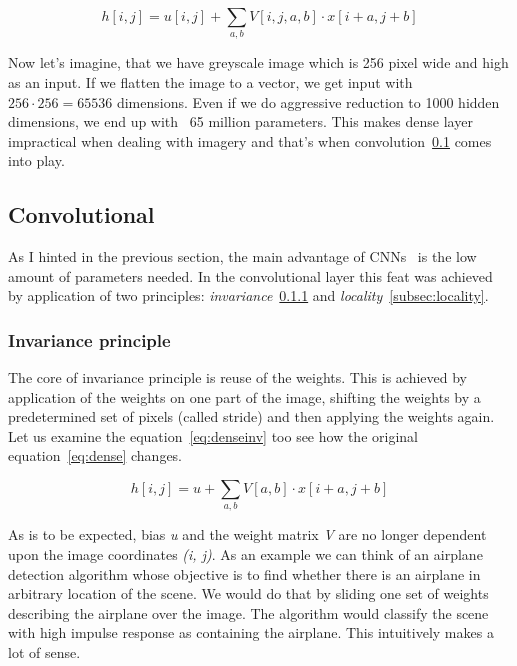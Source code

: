 \begin{equation}
    \label{eq:dense}
    h[i, j] = u[i,j] + \sum_{a,b} V[i,j,a,b] \cdot x[i+a,j+b]
\end{equation}

Now let's imagine, that we have greyscale image which is 256 pixel wide and high as an input.
If we flatten the image to a vector, we get input with $256\cdot256 = 65536$ dimensions.
Even if we do aggressive reduction to 1000 hidden dimensions, we end up with ~65 million parameters.
This makes dense layer impractical when dealing with imagery and that's when convolution~\ref{sec:convolutional} comes
into play.

\subsection{Convolutional}\label{sec:convolutional}
As I hinted in the previous section, the main advantage of CNNs~\cite{ConvLayer} is the low amount of parameters needed.
In the convolutional layer this feat was achieved by application of two principles:
\textit{invariance}~\ref{subsec:invariance} and \textit{locality}~\ref{subsec:locality}.

\subsubsection{Invariance principle}\label{subsec:invariance}
The core of invariance principle is reuse of the weights.
This is achieved by application of the weights on one part of the image, shifting the weights by a predetermined set
of pixels (called stride) and then applying the weights again.
Let us examine the equation~\ref{eq:denseinv} too see how the original equation~\ref{eq:dense} changes.

\begin{equation}
    \label{eq:denseinv}
    h[i, j] = u + \sum_{a,b} V[a,b] \cdot x[i+a,j+b]
\end{equation}

As is to be expected, bias \textit{u} and the weight matrix \textit{V} are no longer dependent upon the image
coordinates \textit{(i, j)}.
As an example we can think of an airplane detection algorithm whose objective is to find whether there is an airplane
in arbitrary location of the scene.
We would do that by sliding one set of weights describing the airplane over the image.
The algorithm would classify the scene with high impulse response as containing the airplane.
This intuitively makes a lot of sense.

